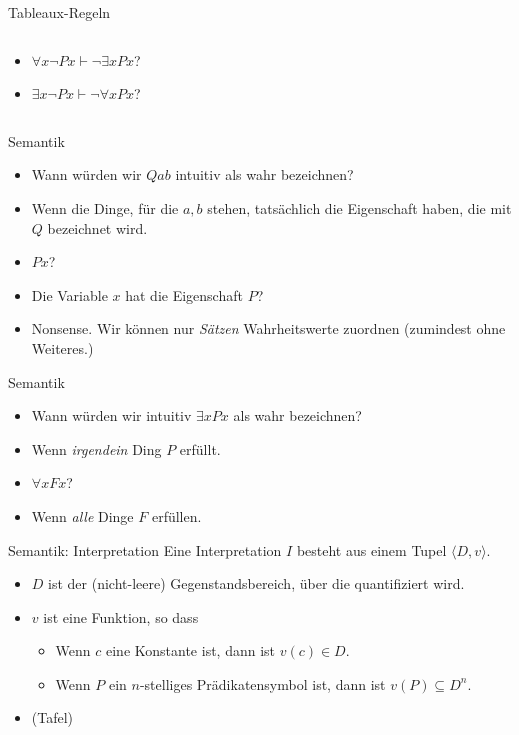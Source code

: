 \documentclass[12pt]{beamer}
\begin{document}
\begin{frame}{Tableaux-Regeln}
\begin{columns}
  \begin{column}[t]{.5 \linewidth}
    \begin{itemize}[<+->]
    \item $\forall x \neg Px \vdash \neg \exists x Px$?
    \item $\exists x \neg Px \vdash \neg \forall x Px$?
    \end{itemize}

  \end{column}
\end{columns}

\end{frame}



\begin{frame}{Semantik}
  \begin{itemize}[<+->]
  \item Wann würden wir $Qab$ intuitiv als wahr bezeichnen?

  \item Wenn die Dinge, für die $a,b$ stehen, tatsächlich die
    Eigenschaft haben, die mit $Q$ bezeichnet wird.
  \item $Px$?

  \item Die Variable $x$ hat die Eigenschaft $P$?
  \item Nonsense. Wir können nur \emph{Sätzen} Wahrheitswerte zuordnen
    (zumindest ohne Weiteres.)
  \end{itemize}
\end{frame}

\begin{frame}{Semantik}
  \begin{itemize}[<+->]
  \item Wann würden wir intuitiv $\exists x Px$ als wahr bezeichnen?
  \item Wenn \emph{irgendein} Ding $P$ erfüllt.
  \item $\forall x Fx$?
  \item Wenn \emph{alle} Dinge $F$ erfüllen.
  \end{itemize}
\end{frame}

\begin{frame}{Semantik: Interpretation}
  Eine Interpretation $I$ besteht aus einem Tupel
  $\langle D,v\rangle$.
  \begin{itemize}[<+->]
  \item $D$ ist der (nicht-leere) Gegenstandsbereich, über die
    quantifiziert wird.
  
  \item $v$ ist eine Funktion, so dass
    \begin{itemize}
    \item Wenn $c$ eine Konstante ist, dann ist $v(c) \in D$.
    \item Wenn $P$ ein $n$-stelliges Prädikatensymbol ist, dann ist
      $v(P) \subseteq D^n$.
    \end{itemize}
  \item (Tafel)
  \end{itemize}

\end{frame}
\end{document}
